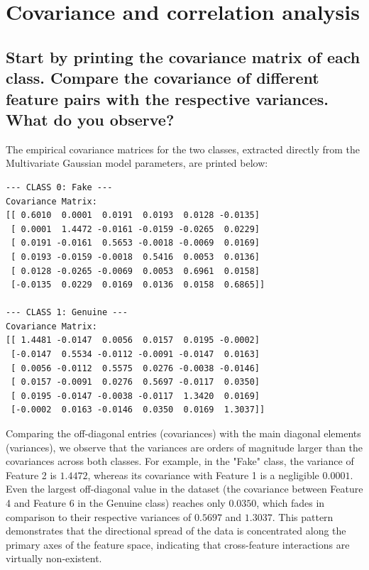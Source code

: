 \section{Covariance and correlation analysis}

\subsection*{Start by printing the covariance matrix of each class. Compare the covariance of different feature pairs with the respective variances. What do you observe?}

The empirical covariance matrices for the two classes, extracted directly from the Multivariate Gaussian model parameters, are printed below:

\begin{small}
\begin{verbatim}
--- CLASS 0: Fake ---
Covariance Matrix:
[[ 0.6010  0.0001  0.0191  0.0193  0.0128 -0.0135]
 [ 0.0001  1.4472 -0.0161 -0.0159 -0.0265  0.0229]
 [ 0.0191 -0.0161  0.5653 -0.0018 -0.0069  0.0169]
 [ 0.0193 -0.0159 -0.0018  0.5416  0.0053  0.0136]
 [ 0.0128 -0.0265 -0.0069  0.0053  0.6961  0.0158]
 [-0.0135  0.0229  0.0169  0.0136  0.0158  0.6865]]

--- CLASS 1: Genuine ---
Covariance Matrix:
[[ 1.4481 -0.0147  0.0056  0.0157  0.0195 -0.0002]
 [-0.0147  0.5534 -0.0112 -0.0091 -0.0147  0.0163]
 [ 0.0056 -0.0112  0.5575  0.0276 -0.0038 -0.0146]
 [ 0.0157 -0.0091  0.0276  0.5697 -0.0117  0.0350]
 [ 0.0195 -0.0147 -0.0038 -0.0117  1.3420  0.0169]
 [-0.0002  0.0163 -0.0146  0.0350  0.0169  1.3037]]
\end{verbatim}
\end{small}

Comparing the off-diagonal entries (covariances) with the main diagonal elements (variances), we observe that the variances are orders of magnitude larger than the covariances across both classes. For example, in the "Fake" class, the variance of Feature 2 is $1.4472$, whereas its covariance with Feature 1 is a negligible $0.0001$. Even the largest off-diagonal value in the dataset (the covariance between Feature 4 and Feature 6 in the Genuine class) reaches only $0.0350$, which fades in comparison to their respective variances of $0.5697$ and $1.3037$. This pattern demonstrates that the directional spread of the data is concentrated along the primary axes of the feature space, indicating that cross-feature interactions are virtually non-existent.

